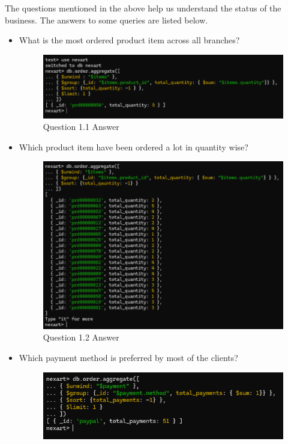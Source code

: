 \documentclass[a4Paper,12pt]{report}
\begin{document}
The questions mentioned in the above help us understand the status of the business. The answers to some queries are listed below.
\begin{itemize}
\item What is the most ordered product item across all branches?
\begin{figure}[H]
\centering
\includegraphics[scale=0.5]{images/Q1.1.png}
\caption{Question 1.1 Answer}
\end{figure}
\item Which product item have been ordered a lot in quantity wise?
\begin{figure}[H]
\centering
\includegraphics[scale=0.5]{images/Q1.2.png}
\caption{Question 1.2 Answer}
\end{figure}
\item Which payment method is preferred by most of the clients?
\begin{figure}[H]
\centering
\includegraphics[scale=0.5]{images/Q1.3.png}

\end{figure}
\end{itemize}
\end{document}
